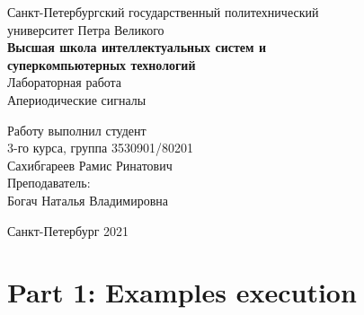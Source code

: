 \documentclass[a4paper]{article}
\begin{document}
    \begin{center}
        \begin{center}
        \hfill \break
        \normalsize{Санкт-Петербургский государственный политехнический}\\
        \normalsize{университет Петра Великого}\\
        \hfill \break
        \normalsize{\textbf{Высшая школа интеллектуальных систем и}}\\ 
        \normalsize{\textbf{суперкомпьютерных технологий}}\\ 
        \hfill \break
        \hfill \break
        \hfill \break
        \normalsize{Лабораторная работа}\\
        \hfill \break
        \hfill \break
        \normalsize{\LARGE Апериодические сигналы}\\
        \end{center}
        \hfill \break
        \hfill \break
        \hfill \break
        \hfill \break
        \hfill \break
        \hfill \break
        \hfill \break
        \hfill \break
        \hfill \break
        \hfill \break
        \begin{flushright}
            \normalsize{Работу выполнил студент}\\
            \normalsize{3-го курса, группа 3530901/80201}\\
            \normalsize{Сахибгареев Рамис Ринатович}\\
            \hfill \break
            \normalsize{Преподаватель:}\\
            \normalsize{Богач Наталья Владимировна}\\
        \end{flushright}
        \hfill \break
        \hfill \break
        \hfill \break
        \hfill \break
        \begin{center} Санкт-Петербург 2021 \end{center}
        \thispagestyle{empty}
    \end{center}
    
    \newpage
        \tableofcontents
    
    \newpage
         \listoffigures
    
    \newpage
         \lstlistoflistings   
     
    \newpage
        \section{Part 1: Examples execution}
        
\end{document}
